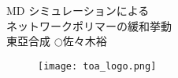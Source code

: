 \begin{minipage}[]{0.7\columnwidth}
	\centering
		\Huge MD シミュレーションによる\\ネットワークポリマーの緩和挙動  \\[10mm]
		\Large 東亞合成 $\bigcirc$佐々木裕 \\
	\end{minipage}
	\begin{minipage}[]{0.29\columnwidth}
		\begin{figure}\centering
			\texttt{[image: toa\_logo.png]}
		\end{figure}
	\end{minipage}